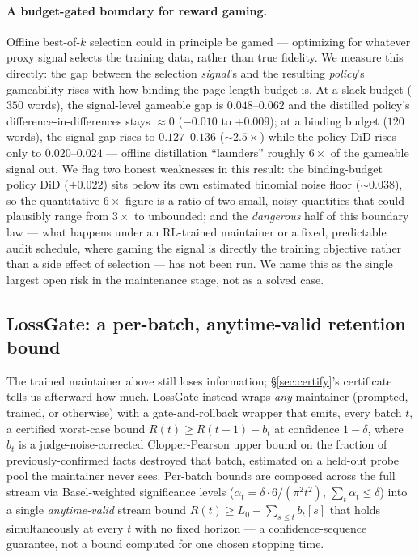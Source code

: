 \paragraph{A budget-gated boundary for reward gaming.} Offline best-of-$k$ selection could in principle be gamed --- optimizing for whatever proxy signal selects the training data, rather than true fidelity. We measure this directly: the gap between the selection \emph{signal}'s and the resulting \emph{policy}'s gameability rises with how binding the page-length budget is. At a slack budget ($350$ words), the signal-level gameable gap is $0.048$--$0.062$ and the distilled policy's difference-in-differences stays $\approx 0$ ($-0.010$ to $+0.009$); at a binding budget ($120$ words), the signal gap rises to $0.127$--$0.136$ ($\sim\!2.5\times$) while the policy DiD rises only to $0.020$--$0.024$ --- offline distillation ``launders'' roughly $6\times$ of the gameable signal out. We flag two honest weaknesses in this result: the binding-budget policy DiD ($+0.022$) sits below its own estimated binomial noise floor ($\sim 0.038$), so the quantitative $6\times$ figure is a ratio of two small, noisy quantities that could plausibly range from $3\times$ to unbounded; and the \emph{dangerous} half of this boundary law --- what happens under an RL-trained maintainer or a fixed, predictable audit schedule, where gaming the signal is directly the training objective rather than a side effect of selection --- has not been run. We name this as the single largest open risk in the maintenance stage, not as a solved case.

\subsection{LossGate: a per-batch, anytime-valid retention bound}

The trained maintainer above still loses information; \S\ref{sec:certify}'s certificate tells us afterward how much. LossGate instead wraps \emph{any} maintainer (prompted, trained, or otherwise) with a gate-and-rollback wrapper that emits, every batch $t$, a certified worst-case bound $R(t) \ge R(t-1) - b_t$ at confidence $1-\delta$, where $b_t$ is a judge-noise-corrected Clopper-Pearson upper bound on the fraction of previously-confirmed facts destroyed that batch, estimated on a held-out probe pool the maintainer never sees. Per-batch bounds are composed across the full stream via Basel-weighted significance levels ($\alpha_t = \delta \cdot 6/(\pi^2 t^2)$, $\sum_t \alpha_t \le \delta$) into a single \emph{anytime-valid} stream bound $R(t) \ge L_0 - \sum_{s \le t} b_t[s]$ that holds simultaneously at every $t$ with no fixed horizon --- a confidence-sequence guarantee, not a bound computed for one chosen stopping time.

